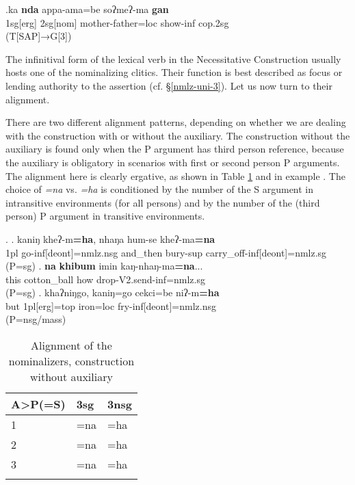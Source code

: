 \exg.ka \textbf{nda} appa-ama=be soʔmeʔ-ma \textbf{gan}\\
		 {\sc 1sg[erg]}  {\sc 2sg[nom]}  mother-father{\sc =loc} show{\sc -inf} {\sc cop.2sg}\\
		 (T[SAP]→G[3])
		


The infinitival form of the lexical verb  in the Necessitative Construction usually hosts one of the nominalizing clitics. Their  function is best described as focus or lending authority to the assertion (cf. §\ref{nmlz-uni-3}). Let us now turn to their alignment. 

There are two different alignment patterns, depending on whether we are dealing with the construction  with or without the auxiliary. The construction without the auxiliary is  found only when the P argument has third person reference, because the auxiliary is obligatory in scenarios with first or second person P arguments. The  alignment here is clearly ergative, as shown in Table \ref{nom-align-without} and in example \Next. The choice of \emph{=na} vs. \emph{=ha} is conditioned by the number of the S argument in intransitive environments (for all persons) and by the number of the (third person) P argument in transitive environments. 


\ex. \ag. kaniŋ kheʔ-m{\bf =ha},                       nhaŋa   hum-se         kheʔ-ma{\bf =na}\\
{\sc 1pl} go{\sc -inf[deont]=nmlz.nsg} and\_then bury{\sc -sup} carry\_off{\sc -inf[deont]=nmlz.sg}\\
 (P=sg) 
\bg. {\bf na}   {\bf khibum}  imin kaŋ-nhaŋ-ma{\bf =na}...\\
this cotton\_ball how drop-{\sc V2.send-inf=nmlz.sg} \\
 (P=sg)  
\bg.  khaʔniŋgo, kaniŋ=go       cekci=be    niʔ-m{\bf =ha} \\
but {\sc 1pl[erg]=top}  iron{\sc =loc} fry-{\sc inf[deont]=nmlz.nsg} \\
 (P=nsg/mass) 


\begin{table}[htp]
\begin{center}
\begin{tabular}{lll}
\lsptoprule
{\bf A>P(=S)} 	&	{\sc 3sg}&{\sc 3nsg}\\
\hline
\hline
1		&=na &  =ha\\
\hline
2		&=na& =ha\\
\hline 
3		&=na&=ha\\
\lspbottomrule
\end{tabular}
\caption{Alignment of the nominalizers, construction without auxiliary}\label{nom-align-without}
\end{center}
\end{table}
 
